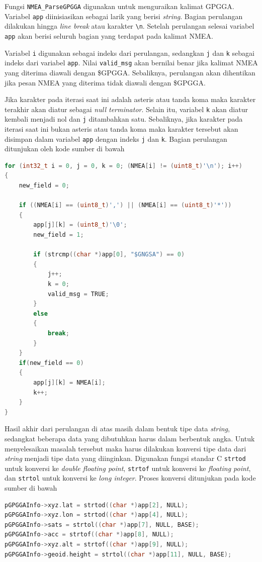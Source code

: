 Fungsi \texttt{NMEA\_ParseGPGGA} digunakan untuk menguraikan kalimat GPGGA. Variabel \texttt{app} diinisiasikan sebagai larik yang berisi \textit{string}. Bagian perulangan dilakukan hingga \textit{line break} atau karakter \texttt{\textbackslash n}. Setelah perulangan selesai variabel \texttt{app} akan berisi seluruh bagian yang terdapat pada kalimat NMEA. 

Variabel \texttt{i} digunakan sebagai indeks dari perulangan, sedangkan \texttt{j} dan \texttt{k} sebagai indeks dari variabel \texttt{app}. Nilai \texttt{valid\_msg} akan bernilai benar jika kalimat NMEA yang diterima diawali dengan \$GPGGA. Sebaliknya, perulangan akan dihentikan jika pesan NMEA yang diterima tidak diawali dengan  \$GPGGA.

Jika karakter pada iterasi saat ini adalah asteris atau tanda koma maka karakter terakhir akan diatur sebagai \textit{null terminator}. Selain itu, variabel \texttt{k} akan diatur kembali menjadi nol dan \texttt{j} ditambahkan satu. Sebaliknya, jika karakter pada iterasi saat ini bukan asteris atau tanda koma maka karakter tersebut akan disimpan dalam variabel \texttt{app} dengan indeks \texttt{j} dan \texttt{k}. Bagian perulangan ditunjukan oleh kode sumber di bawah

\begin{lstlisting}[language=c]
for (int32_t i = 0, j = 0, k = 0; (NMEA[i] != (uint8_t)'\n'); i++)
{
	new_field = 0;
	
	if ((NMEA[i] == (uint8_t)',') || (NMEA[i] == (uint8_t)'*'))
	{
		app[j][k] = (uint8_t)'\0';
		new_field = 1;
		
		if (strcmp((char *)app[0], "$GNGSA") == 0)
		{
			j++;
			k = 0;
			valid_msg = TRUE;
		}
		else
		{
			break;
		}
	}
	if(new_field == 0)
	{
		app[j][k] = NMEA[i];
		k++;
	}
}
\end{lstlisting}

Hasil akhir dari perulangan di atas masih dalam bentuk tipe data \textit{string}, sedangkat beberapa data yang dibutuhkan harus dalam berbentuk angka. Untuk menyelesaikan masalah tersebut maka harus dilakukan konversi tipe data dari \textit{string} menjadi tipe data yang diinginkan. Digunakan fungsi standar C \texttt{strtod} untuk konversi ke \textit{double floating point}, \texttt{strtof} untuk konversi ke \textit{floating point}, dan \texttt{strtol} untuk konversi ke \textit{long integer}. Proses konversi ditunjukan pada kode sumber di bawah
\begin{lstlisting}[language=c]
pGPGGAInfo->xyz.lat = strtod((char *)app[2], NULL);
pGPGGAInfo->xyz.lon = strtod((char *)app[4], NULL);
pGPGGAInfo->sats = strtol((char *)app[7], NULL, BASE);
pGPGGAInfo->acc = strtof((char *)app[8], NULL);
pGPGGAInfo->xyz.alt = strtof((char *)app[9], NULL);
pGPGGAInfo->geoid.height = strtol((char *)app[11], NULL, BASE);
\end{lstlisting}

